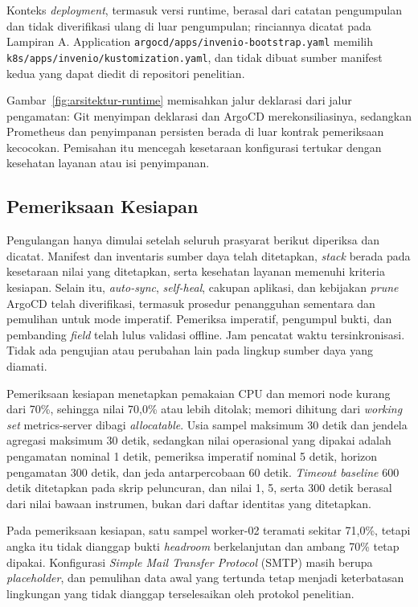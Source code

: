 Konteks \textit{deployment}, termasuk versi runtime, berasal dari catatan pengumpulan dan tidak diverifikasi ulang di luar pengumpulan; rinciannya dicatat pada Lampiran A. Application \texttt{argocd/apps/invenio-bootstrap.yaml} memilih \texttt{k8s/apps/invenio/kustomization.yaml}, dan tidak dibuat sumber manifest kedua yang dapat diedit di repositori penelitian.



Gambar~\ref{fig:arsitektur-runtime} memisahkan jalur deklarasi dari jalur pengamatan: Git menyimpan deklarasi dan ArgoCD merekonsiliasinya, sedangkan Prometheus dan penyimpanan persisten berada di luar kontrak pemeriksaan kecocokan. Pemisahan itu mencegah kesetaraan konfigurasi tertukar dengan kesehatan layanan atau isi penyimpanan.

\subsection{Pemeriksaan Kesiapan}
\label{sec:gerbang-kesiapan}
Pengulangan hanya dimulai setelah seluruh prasyarat berikut diperiksa dan dicatat. Manifest dan inventaris sumber daya telah ditetapkan, \textit{stack} berada pada kesetaraan nilai yang ditetapkan, serta kesehatan layanan memenuhi kriteria kesiapan. Selain itu, \textit{auto-sync}, \textit{self-heal}, cakupan aplikasi, dan kebijakan \textit{prune} ArgoCD telah diverifikasi, termasuk prosedur penangguhan sementara dan pemulihan untuk mode imperatif. Pemeriksa imperatif, pengumpul bukti, dan pembanding \textit{field} telah lulus validasi offline. Jam pencatat waktu tersinkronisasi. Tidak ada pengujian atau perubahan lain pada lingkup sumber daya yang diamati.

Pemeriksaan kesiapan menetapkan pemakaian CPU dan memori node kurang dari 70\%, sehingga nilai 70,0\% atau lebih ditolak; memori dihitung dari \textit{working set} metrics-server dibagi \textit{allocatable}. Usia sampel maksimum 30 detik dan jendela agregasi maksimum 30 detik, sedangkan nilai operasional yang dipakai adalah pengamatan nominal 1 detik, pemeriksa imperatif nominal 5 detik, horizon pengamatan 300 detik, dan jeda antarpercobaan 60 detik. \textit{Timeout baseline} 600 detik ditetapkan pada skrip peluncuran, dan nilai 1, 5, serta 300 detik berasal dari nilai bawaan instrumen, bukan dari daftar identitas yang ditetapkan.

Pada pemeriksaan kesiapan, satu sampel worker-02 teramati sekitar 71,0\%, tetapi angka itu tidak dianggap bukti \textit{headroom} berkelanjutan dan ambang 70\% tetap dipakai. Konfigurasi \textit{Simple Mail Transfer Protocol} (SMTP) masih berupa \textit{placeholder}, dan pemulihan data awal yang tertunda tetap menjadi keterbatasan lingkungan yang tidak dianggap terselesaikan oleh protokol penelitian.

